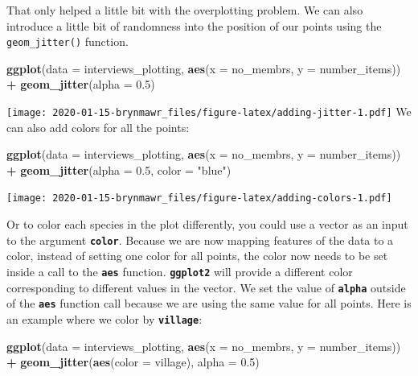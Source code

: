 \documentclass[]{book}
\newenvironment{Shaded}{\begin{snugshade}}{\end{snugshade}}
\newcommand{\KeywordTok}[1]{\textcolor[rgb]{0.13,0.29,0.53}{\textbf{#1}}}
\newcommand{\DataTypeTok}[1]{\textcolor[rgb]{0.13,0.29,0.53}{#1}}
\newcommand{\FloatTok}[1]{\textcolor[rgb]{0.00,0.00,0.81}{#1}}
\newcommand{\StringTok}[1]{\textcolor[rgb]{0.31,0.60,0.02}{#1}}
\newcommand{\OperatorTok}[1]{\textcolor[rgb]{0.81,0.36,0.00}{\textbf{#1}}}
\newcommand{\NormalTok}[1]{#1}
\begin{document}
That only helped a little bit with the overplotting problem. We can also
introduce a little bit of randomness into the position of our points
using the \texttt{geom\_jitter()} function.

\begin{Shaded}
\begin{Highlighting}[]
\KeywordTok{ggplot}\NormalTok{(}\DataTypeTok{data =}\NormalTok{ interviews_plotting, }\KeywordTok{aes}\NormalTok{(}\DataTypeTok{x =}\NormalTok{ no_membrs, }\DataTypeTok{y =}\NormalTok{ number_items)) }\OperatorTok{+}
\StringTok{    }\KeywordTok{geom_jitter}\NormalTok{(}\DataTypeTok{alpha =} \FloatTok{0.5}\NormalTok{)}
\end{Highlighting}
\end{Shaded}

\texttt{[image: 2020-01-15-brynmawr\_files/figure-latex/adding-jitter-1.pdf]}
We can also add colors for all the points:

\begin{Shaded}
\begin{Highlighting}[]
\KeywordTok{ggplot}\NormalTok{(}\DataTypeTok{data =}\NormalTok{ interviews_plotting, }\KeywordTok{aes}\NormalTok{(}\DataTypeTok{x =}\NormalTok{ no_membrs, }\DataTypeTok{y =}\NormalTok{ number_items)) }\OperatorTok{+}
\StringTok{    }\KeywordTok{geom_jitter}\NormalTok{(}\DataTypeTok{alpha =} \FloatTok{0.5}\NormalTok{, }\DataTypeTok{color =} \StringTok{"blue"}\NormalTok{)}
\end{Highlighting}
\end{Shaded}

\texttt{[image: 2020-01-15-brynmawr\_files/figure-latex/adding-colors-1.pdf]}

Or to color each species in the plot differently, you could use a vector
as an input to the argument \textbf{\texttt{color}}. Because we are now
mapping features of the data to a color, instead of setting one color
for all points, the color now needs to be set inside a call to the
\textbf{\texttt{aes}} function. \textbf{\texttt{ggplot2}} will provide a
different color corresponding to different values in the vector. We set
the value of \textbf{\texttt{alpha}} outside of the
\textbf{\texttt{aes}} function call because we are using the same value
for all points. Here is an example where we color by
\textbf{\texttt{village}}:

\begin{Shaded}
\begin{Highlighting}[]
\KeywordTok{ggplot}\NormalTok{(}\DataTypeTok{data =}\NormalTok{ interviews_plotting, }\KeywordTok{aes}\NormalTok{(}\DataTypeTok{x =}\NormalTok{ no_membrs, }\DataTypeTok{y =}\NormalTok{ number_items)) }\OperatorTok{+}
\StringTok{    }\KeywordTok{geom_jitter}\NormalTok{(}\KeywordTok{aes}\NormalTok{(}\DataTypeTok{color =}\NormalTok{ village), }\DataTypeTok{alpha =} \FloatTok{0.5}\NormalTok{)}
\end{Highlighting}
\end{Shaded}
\end{document}
